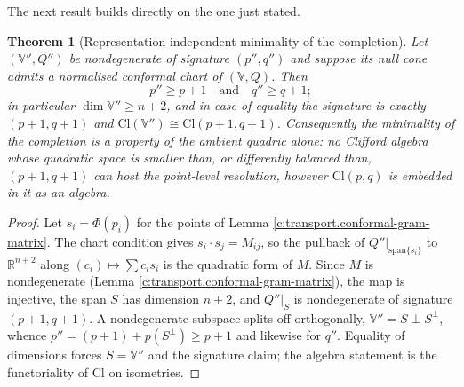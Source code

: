 \documentclass[11pt]{article}
\newtheorem{theorem}{Theorem}[section]
\theoremstyle{definition}
\theoremstyle{plain}
\providecommand{\Cl}{}\renewcommand{\Cl}{\mathrm{Cl}}
\providecommand{\R}{}\renewcommand{\R}{\mathbb{R}}
\begin{document}
The next result builds directly on the one just stated.

\begin{theorem}[Representation-independent minimality of the completion]\label{c:transport.representation-independent-minimality-completion}
Let $(\mathbb{V}'', Q'')$ be nondegenerate of signature $(p'', q'')$ and suppose its null cone admits a normalised conformal chart of $(\mathbb{V}, Q)$. Then
\[
p'' \geq p + 1 \quad \text{and} \quad q'' \geq q + 1 ;
\]
in particular $\dim \mathbb{V}'' \geq n + 2$, and in case of equality the signature is exactly $(p{+}1, q{+}1)$ and $\Cl(\mathbb{V}'') \cong \Cl(p{+}1, q{+}1)$. Consequently the minimality of the completion is a property of the ambient quadric alone: no Clifford algebra whose quadratic space is smaller than, or differently balanced than, $(p{+}1, q{+}1)$ can host the point-level resolution, \emph{however} $\Cl(p,q)$ is embedded in it as an algebra.
\end{theorem}
\begin{proof}
Let $s_i = \Phi(p_i)$ for the points of Lemma \ref{c:transport.conformal-gram-matrix}. The chart condition gives $s_i \cdot s_j = M_{ij}$, so the pullback of $Q''|_{\mathrm{span}\{s_i\}}$ to $\R^{n+2}$ along $(c_i) \mapsto \sum c_i s_i$ is the quadratic form of $M$. Since $M$ is nondegenerate (Lemma \ref{c:transport.conformal-gram-matrix}), the map is injective, the span $S$ has dimension $n+2$, and $Q''|_S$ is nondegenerate of signature $(p{+}1, q{+}1)$. A nondegenerate subspace splits off orthogonally, $\mathbb{V}'' = S \perp S^\perp$, whence $p'' = (p{+}1) + p(S^\perp) \geq p+1$ and likewise for $q''$. Equality of dimensions forces $S = \mathbb{V}''$ and the signature claim; the algebra statement is the functoriality of $\Cl$ on isometries.

\end{proof}
\end{document}
